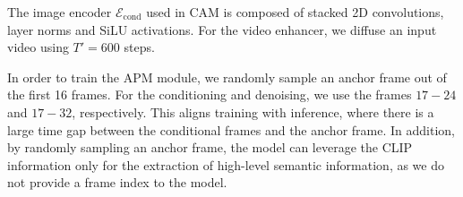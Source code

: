
The image encoder $\mathcal{E}_{\mathrm{cond}}$ used in CAM is composed of stacked 2D convolutions, layer norms and SiLU activations.
For the video enhancer, we diffuse an input video using $T'=600$ steps.
%



In order to train the APM module, we randomly sample an anchor frame out of the first 16 frames. For the conditioning and denoising, we use the frames $17-24$ and $17-32$, respectively. This aligns training with inference, where there is a large time gap between the conditional frames and the anchor frame. In addition, by randomly sampling an anchor frame, the model can leverage the CLIP information only for the extraction of high-level semantic information, as we do not provide a frame index to the model. 


